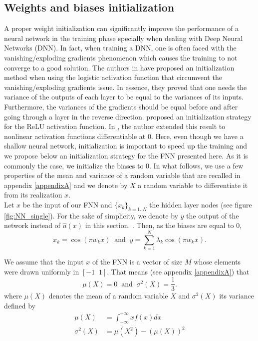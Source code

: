 \documentclass[AMS,STIX1COL]{WileyNJD-v2}
\begin{document}
\subsection{Weights and biases initialization}\label{subsec:weightsini}
A proper weight initialization can significantly improve the performance of a neural network in the training phase specially when dealing with Deep Neural Networks (DNN). In fact, when training a DNN, one is often faced with the vanishing/exploding gradients phenomenon \cite{Geron2017} which causes the training to not converge to a good solution. The authors in \cite{Glorot2010} have proposed an initialization method when using the logistic activation function that circumvent the vanishing/exploding gradients issue. In essence, they proved that one needs the variance of the outputs of each layer to be equal to the variances of its inputs. Furthermore, the variances of the gradients should be equal before and after going through a layer in the reverse direction. \cite{Heinit2015} proposed an initialization strategy for the ReLU activation function. In \cite{Kumar2017}, the author extended this result to nonlinear activation functions differentiable at $0$. Here, even though we have a shallow neural network, initialization is important to speed up the training and we propose below an initialization strategy for the FNN presented here. As it is commonly the case, we initialize the biases to $0$. In what follows, we use a few properties of the mean and variance of a random variable that are recalled in appendix \ref{appendixA} and we denote by $X$ a random variable to differentiate it from its realization $x$. \\
Let $x$ be the input of our FNN and $\{x_k\}_{k = 1..N}$ the hidden layer nodes (see figure \ref{fig:NN_single}). For the sake of simplicity, we denote by $y$ the output of the network instead of $\hat{u}(x)$ in this section. . Then, as the biases are equal to $0$,
$$
x_k = \cos(\pi w_k x ) \;\; \text{and}\;\; y = \sum_{k = 1}^N \lambda_k \cos(\pi w_k x). 
$$

 We assume that the input $x$ of the FNN is a vector of size $M$ whose elements were drawn uniformly in $[-1 \;\; 1]$. That means (see appendix \ref{appendixA}) that $$\mu(X) = 0  \;\; \text{and}\;\; \sigma^2(X) = \frac{1}{3}. $$ where $\mu(X)$ denotes the mean of a random variable $X$ and $\sigma^2(X)$ its variance defined by
 \begin{align*}
     \mu(X) &= \int_{-\infty}^{+\infty} xf(x) dx \\
     \sigma^2(X) &= \mu(X^2) - \left(\mu(X)\right)^2
 \end{align*}
\end{document}
